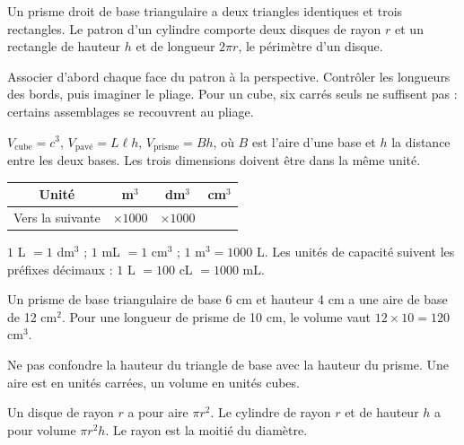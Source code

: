 \begin{propriete}Un prisme droit de base triangulaire a deux triangles identiques et trois rectangles. Le patron d’un cylindre comporte deux disques de rayon $r$ et un rectangle de hauteur $h$ et de longueur $2\pi r$, le périmètre d’un disque.\end{propriete}
\begin{savoirfaire}Associer d’abord chaque face du patron à la perspective. Contrôler les longueurs des bords, puis imaginer le pliage. Pour un cube, six carrés seuls ne suffisent pas : certains assemblages se recouvrent au pliage.\end{savoirfaire}
\clearpage
{}\label{cours-17-3}
\begin{propriete}$V_{\mathrm{cube}}=c^3$, $V_{\mathrm{pavé}}=L\ell h$, $V_{\mathrm{prisme}}=B h$, où $B$ est l’aire d’une base et $h$ la distance entre les deux bases. Les trois dimensions doivent être dans la même unité.\end{propriete}
\begin{center}\renewcommand{\arraystretch}{1.35}\begin{tabular}{c|ccc}\toprule
Unité & m$^3$ & dm$^3$ & cm$^3$\\\midrule
Vers la suivante & $\times1000$ & $\times1000$ & \\
\bottomrule\end{tabular}\end{center}
\begin{propriete}$1$ L $=1$ dm$^3$ ; $1$ mL $=1$ cm$^3$ ; $1$ m$^3=1000$ L. Les unités de capacité suivent les préfixes décimaux : $1$ L $=100$ cL $=1000$ mL.\end{propriete}
\begin{exemple}Un prisme de base triangulaire de base 6 cm et hauteur 4 cm a une aire de base de 12 cm$^2$. Pour une longueur de prisme de 10 cm, le volume vaut $12\times10=120$ cm$^3$.\end{exemple}
\begin{attention}Ne pas confondre la hauteur du triangle de base avec la hauteur du prisme. Une aire est en unités carrées, un volume en unités cubes.\end{attention}
\clearpage
{}\label{cours-17-4}
\begin{propriete}Un disque de rayon $r$ a pour aire $\pi r^2$. Le cylindre de rayon $r$ et de hauteur $h$ a pour volume $\pi r^2h$. Le rayon est la moitié du diamètre.\end{propriete}
\label{fig-cours-17-4-cours-cylindre}

